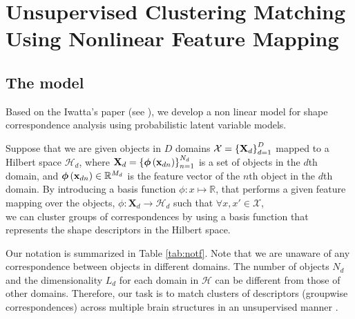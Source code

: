 \chapter{Unsupervised Clustering Matching Using Nonlinear Feature Mapping}

\section{The model}

Based on the Iwatta's paper (see \cite{Iwata13,Iwata16}), we develop a non linear model for shape correspondence analysis using probabilistic latent variable models.

Suppose that we are given objects in $D$ domains $\mathcal{X}=\left\{\mathbf{X}_d\right\}_{d=1}^D$ mapped to a Hilbert space $\mathcal{H}_d$, where $\mathbf{X}_d = \left\{\boldsymbol{\phi}\left(\mathbf{x}_{dn}\right)\right\}_{n=1}^{N_d}$ is a set of objects in the $d$th domain, and $\boldsymbol{\phi}\left(\mathbf{x}_{dn}\right) \in \mathbb{R}^{M_d}$ is  the feature vector of the $n$th object in the $d$th domain. By introducing a basis function $\phi:x \mapsto \mathbb{R}$, that performs a given feature mapping over the objects, $\phi : \mathbf{X}_d\to\mathcal{H}_d$ such that $\forall x,x' \in \mathcal{X}$,\\

we can cluster groups of correspondences by using a basis function that represents the shape descriptors in the Hilbert space.

Our notation is summarized in Table \ref{tab:notf}. Note that we are unaware of any correspondence between objects in different domains. The number of objects $N_d$ and the dimensionality $L_d$ for each domain in $\mathcal{H}$ can be different from those of other domains.  Therefore, our task is to match clusters of descriptors (groupwise correspondences) across multiple brain structures in an
unsupervised manner \cite{Iwata16}.

